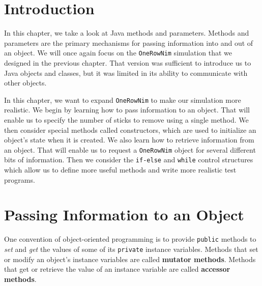 \section{Introduction}

\noindent In this chapter, we take a look at Java methods and parameters.
Methods and parameters are the primary mechanisms for passing
information into and out of an object.  We will once again focus on
the {\tt OneRowNim} simulation that we designed in the previous chapter.
That version was sufficient to introduce us to Java
objects and classes, but it was limited in its ability to
communicate with other objects.

In this chapter, we want to expand {\tt OneRowNim} to make our
simulation more realistic.  We begin by learning how to pass
information to an object.  That will enable us to specify the number of
sticks to remove using a single method.  We then consider special
methods called constructors, which
are used to initialize an object's state when it is created.   We also
learn how to retrieve information from an object.  That will enable us
to request a {\tt OneRowNim} object for several different bits of information.
Then we consider the {\tt if-else} and {\tt while} control structures
which allow us to define more useful methods and write more realistic
test programs.

\section{Passing Information to an Object}
\noindent  One convention of object-oriented programming is to
provide {\tt public} methods to {\it set} and {\it get} the values of
some of its {\tt private} instance variables. Methods that set or
modify an object's instance variables are called {\bf mutator methods}.
Methods that get or retrieve the value of an instance variable are
called {\bf accessor methods}.



